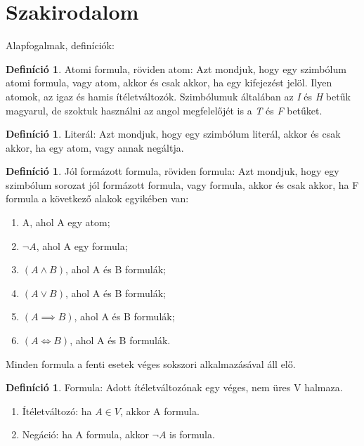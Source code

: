 \documentclass[
]{thesis-ekf}
\theoremstyle{definition}
\newtheorem{definicio}[tetel]{Definíció}
\theoremstyle{remark}
\begin{document}
	\section{Szakirodalom}

	Alapfogalmak, definíciók:
	
	\begin{definicio}
		Atomi formula, röviden atom:  Azt mondjuk, hogy egy szimbólum atomi formula, vagy atom, akkor és csak akkor, ha egy kifejezést jelöl. Ilyen atomok, az igaz és hamis ítéletváltozók. Szimbólumuk általában az \emph{I} és \emph{H} betűk magyarul, de szoktuk használni az angol megfelelőjét is a \emph{T} és \emph{F} betűket.
	\end{definicio}
	\begin{definicio}
		Literál: Azt mondjuk, hogy egy szimbólum literál, akkor és csak akkor, ha egy atom, vagy annak negáltja.
	\end{definicio}
	\begin{definicio}		
		Jól formázott formula, röviden formula: Azt mondjuk, hogy egy szimbólum sorozat jól formázott formula, vagy formula, akkor és csak akkor, ha F formula a következő alakok egyikében van:
		\begin{enumerate}[label=\textit{(\alph*)}]
			\item A, ahol A egy atom;
			\item $ \neg A $, ahol A egy formula;
			\item $ (A \wedge B) $, ahol A és B formulák;
			\item $ (A \vee B) $, ahol A és B formulák;
			\item $ (A \implies B) $, ahol A és B formulák;
			\item $ (A \Leftrightarrow B) $, ahol A és B formulák.
		\end{enumerate}
		Minden formula a fenti esetek véges sokszori alkalmazásával áll elő.
	\end{definicio}
	\begin{definicio}
		Formula: Adott ítéletváltozónak egy véges, nem üres V halmaza.
		\begin{enumerate}
			\item Ítéletváltozó: ha $ A\in V $, akkor A formula.
			\item Negáció: ha A formula, akkor $\neg A $ is formula.
		\end{enumerate}
	\end{definicio}
\end{document}
